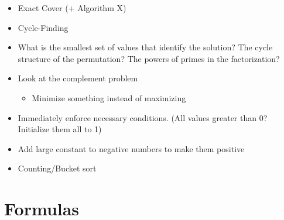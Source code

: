 \documentclass[8pt,a4paper,landscape,oneside]{amsart}
\newenvironment{myitemize}
{ \begin{itemize}[leftmargin=.5cm]
    \setlength{\itemsep}{0pt}
    \setlength{\parskip}{0pt}
    \setlength{\parsep}{0pt}     }
{ \end{itemize}                  }
\begin{document}
\begin{multicols*}{3}
\begin{myitemize}
                \item Exact Cover (+ Algorithm X)
                \item Cycle-Finding
                \item What is the smallest set of values that identify the solution? The cycle structure of the permutation? The powers of primes in the factorization?
                \item Look at the complement problem
                    \begin{itemize}
                        \item Minimize something instead of maximizing
                    \end{itemize}
                \item Immediately enforce necessary conditions. (All values greater than 0? Initialize them all to 1)
                \item Add large constant to negative numbers to make them positive
                \item Counting/Bucket sort
            \end{myitemize}

    \section{Formulas}




\end{multicols*}
\end{document}

